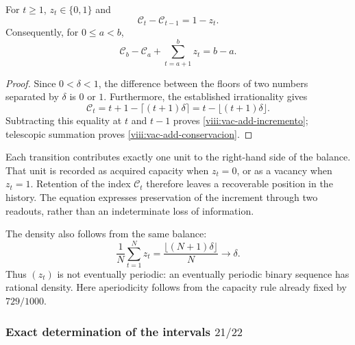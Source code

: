 \begin{proposition}
\label{viii:vac-add-balance}
For \(t\geq1\), \(z_t\in\{0,1\}\) and
\begin{equation}
 \mathcal C_t-\mathcal C_{t-1}=1-z_t.
 \label{viii:vac-add-incremento}
\end{equation}
Consequently, for \(0\leq a<b\),
\begin{equation}
 \mathcal C_b-\mathcal C_a+
 \sum_{t=a+1}^{b}z_t=b-a.
 \label{viii:vac-add-conservacion}
\end{equation}
\end{proposition}
\begin{proof}
Since \(0<\delta<1\), the difference between the floors of two numbers separated by \(\delta\) is \(0\) or \(1\). Furthermore, the established irrationality gives
\[
 \mathcal C_t=t+1-\lceil(t+1)\delta\rceil
             =t-\lfloor(t+1)\delta\rfloor.
\]
Subtracting this equality at \(t\) and \(t-1\) proves \eqref{viii:vac-add-incremento}; telescopic summation proves \eqref{viii:vac-add-conservacion}.
\end{proof}

Each transition contributes exactly one unit to the right-hand side of the balance. That unit is recorded as acquired capacity when \(z_t=0\), or as a vacancy when \(z_t=1\). Retention of the index \(\mathcal C_t\) therefore leaves a recoverable position in the history. The equation expresses preservation of the increment through two readouts, rather than an indeterminate loss of information.

The density also follows from the same balance:
\[
 \frac1N\sum_{t=1}^{N}z_t
 =\frac{\lfloor(N+1)\delta\rfloor}{N}\longrightarrow\delta.
\]
Thus \((z_t)\) is not eventually periodic: an eventually periodic binary sequence has rational density. Here aperiodicity follows from the capacity rule already fixed by \(729/1000\).

\subsubsection{Exact determination of the intervals \(21/22\)}
\label{viii:vac-add-primarios}

